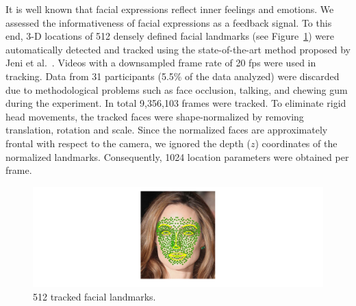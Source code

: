 \documentclass[10pt,journal,compsoc]{IEEEtran}
\begin{document}
It is well known that facial expressions reflect inner feelings
and emotions. We assessed the informativeness of facial
expressions as a feedback signal. To this end, 3-D locations of 512
densely defined facial landmarks (see
Figure~\ref{landmarks}) were automatically detected and
tracked using the state-of-the-art method proposed by Jeni et
al.\ \cite{jeni2015dense}. Videos with a downsampled frame
rate of 20 fps were used in tracking. Data from 31 participants (5.5\% of the data analyzed) %
were discarded due to methodological problems such as face
occlusion, talking, and chewing gum during the experiment. %
In
total 9,356,103 frames were tracked.  %
To eliminate rigid head movements, the tracked faces were
shape-normalized by removing translation, rotation and scale.
Since the normalized faces are approximately frontal with
respect to the camera, we ignored the depth ($z$) coordinates
of the normalized landmarks. Consequently, 1024 location
parameters were obtained per frame. %

\begin{figure}[htb]
\centering
\includegraphics[height=0.56\columnwidth]{markers2.pdf}
\caption{512 tracked facial landmarks.}
\label{landmarks}
\end{figure}
\end{document}
